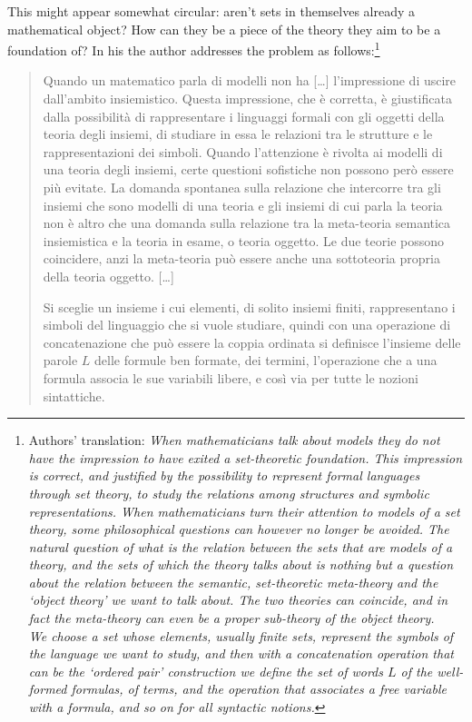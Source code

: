 This might appear somewhat circular: aren't sets in themselves already a mathematical object? How can they be a piece of the theory they aim to be a foundation of? In his \cite{lolli1977categorie} the author addresses the problem as follows:\footnote{Authors' translation: \emph{When mathematicians talk about models they do not have the impression to have exited a set-theoretic foundation. This impression is correct, and justified by the possibility to represent formal languages through set theory, to study the relations among structures and symbolic representations. When mathematicians turn their attention to models of a set theory, some philosophical questions can however no longer be avoided. The natural question of what is the relation between the sets that are models of a theory, and the sets of which the theory talks about is nothing but a question about the relation between the semantic, set-theoretic meta-theory and the `object theory' we want to talk about. The two theories can coincide, and in fact the meta-theory can even be a proper sub-theory of the object theory.\\
		\indent We choose a set whose elements, usually finite sets, represent the symbols of the language we want to study, and then with a concatenation operation that can be the `ordered pair' construction we define the set of words $L$ of the well-formed formulas, of terms, and the operation that associates a free variable with a formula, and so on for all syntactic notions.}}
\begin{quote}
	Quando un matematico parla di modelli non ha [\dots\unkern] l'impressione di uscire dall'ambito insiemistico. Questa impressione, che è corretta, è giustificata dalla possibilità di rappresentare i linguaggi formali con gli oggetti della teoria degli insiemi, di studiare in essa le relazioni tra le strutture e le rappresentazioni dei simboli. Quando l'attenzione è rivolta ai modelli di una teoria degli insiemi, certe questioni sofistiche non possono però essere più evitate. La domanda spontanea sulla relazione che intercorre tra gli insiemi che so­no modelli di una teoria e gli insiemi di cui parla la teoria non è altro che una domanda sulla relazione tra la meta\hyp{}teoria semantica insiemi­stica e la teoria in esame, o teoria oggetto. Le due teorie possono coincidere, anzi la meta\hyp{}teoria può essere anche una sottoteoria pro­pria della teoria oggetto. [\dots\unkern]

	Si sceglie un insieme i cui elementi, di solito insiemi finiti, rappresentano i simboli del linguaggio che si vuole studiare, quindi con una operazione di concatenazione che può essere la coppia ordinata si definisce l'insieme delle parole $L$ delle for­mule ben formate, dei termini, l'operazione che a una formula asso­cia le sue variabili libere, e così via per tutte le nozioni sintattiche.
\end{quote}
